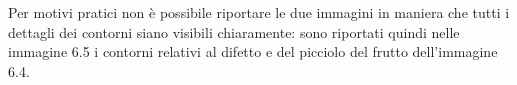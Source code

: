 \documentclass[12pt,a4paper]{report}
\begin{document}
{\begin{figure}[H]
\centering
\begin{floatrow}[1]
\end{floatrow}
\end{figure} 

Per motivi pratici non è possibile riportare le due immagini in maniera che tutti i dettagli dei contorni siano visibili chiaramente: sono riportati quindi nelle immagine 6.5 i contorni relativi al difetto e del picciolo del frutto dell'immagine 6.4.

}
\end{document}

